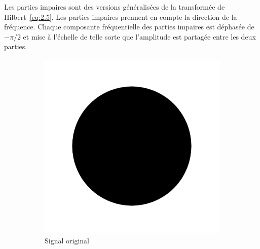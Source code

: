 \bigskip

Les parties impaires sont des versions généralisées de la transformée de Hilbert~\ref{eq:2.5}. Les parties impaires prennent en compte la direction de la fréquence. Chaque composante fréquentielle des parties impaires est déphasée de $-\pi/2$ et mise à l'échelle de telle sorte que l'amplitude est partagée entre les deux parties.

\bigskip

\begin{figure}
    \centering
    \begin{subfigure}[b]{.3\textwidth}
        \includegraphics[width=\textwidth]{contenu/resources/images/disk}
        \caption{Signal original}
    \end{subfigure}
    \hfill
    \begin{subfigure}[b]{.3\textwidth}

\end{subfigure}
\end{figure}
